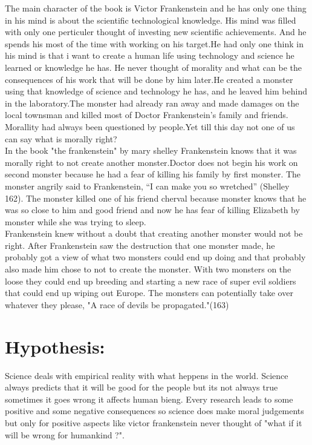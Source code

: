 \documentclass[12pt]{report}
\begin{document}
The main character of the book is Victor Frankenstein and he has only one thing in his mind is about the  scientific technological knowledge. His mind was filled with only one perticuler thought of investing new scientific achievements. And he spends his most of the time with working on his target.He had only one think in his mind is that i want to create a human life using technology and science he learned or knowledge he has. He never thought of morality and what can be the consequences of his work that will be done by him later.He created a monster using that knowledge of science and technology he has, and he leaved  him behind in the laboratory.The monster had already ran away and made damages on the local townsman and killed most of Doctor Frankenstein’s family and friends.
\\

Morallity had always been questioned by people.Yet till this day not one of us can say what is morally right? 
\\

In the book "the frankenstein" by mary shelley Frankenstein knows that it was morally right to not create another monster.Doctor does not begin his work on second monster because he had a fear of killing his family by first monster. The monster angrily said to Frankenstein, “I can make you so wretched” (Shelley 162). The monster killed one of his friend cherval because monster knows that he was so close to him and good friend and now he has fear of killing Elizabeth by monster while she was trying to sleep.\\

Frankenstein knew without a doubt that creating another monster would not be right. After Frankenstein saw the destruction that one monster made, he probably got a view of what two monsters could end up doing and that probably also made him chose to not to create the monster. With two monsters on the loose they could end up breeding and starting a new race of super evil soldiers that could end up wiping out Europe. The monsters can potentially take over whatever they please, "A race of devils be propagated."(163) 
\newpage
\section{Hypothesis:}
\LARGE
Science deals with empirical reality with what heppens in the world.
Science always predicts that it will be good for the people but its not always true sometimes it goes wrong it affects human bieng.
Every research leads to some positive and some negative consequences so science does make moral judgements but only for positive aspects like victor frankenstein never thought of  "what if it will be wrong for humankind ?".
\newpage
\end{document}
